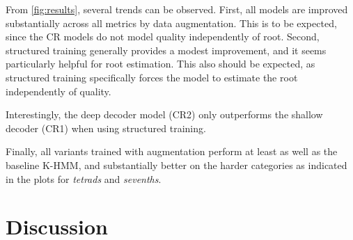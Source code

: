 \documentclass{article}
\begin{document}
From \cref{fig:results}, several trends can be observed.
First, all models are improved substantially across all metrics by data augmentation.  This is to be expected, since the CR models do not model quality independently of root.
Second, structured training generally provides a modest improvement, and it seems particularly helpful for root estimation.
This also should be expected, as structured training specifically forces the model to estimate the root independently of quality.

Interestingly, the deep decoder model (CR2) only outperforms the shallow decoder (CR1) when using structured training.

Finally, all variants trained with augmentation perform at least as well as the baseline K-HMM, and substantially better on the harder categories as indicated in the plots for \emph{tetrads} and \emph{sevenths}.
\section{Discussion}




\end{document}
